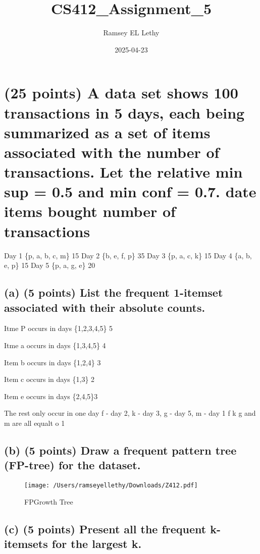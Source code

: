 \documentclass[
]{article}
\title{CS412\_Assignment\_5}
\author{Ramsey EL Lethy}
\date{2025-04-23}
\begin{document}
\maketitle

\section{(25 points) A data set shows 100 transactions in 5 days, each
being summarized as a set of items associated with the number of
transactions. Let the relative min sup = 0.5 and min conf = 0.7. date
items bought number of
transactions}\label{points-a-data-set-shows-100-transactions-in-5-days-each-being-summarized-as-a-set-of-items-associated-with-the-number-of-transactions.-let-the-relative-min-sup-0.5-and-min-conf-0.7.-date-items-bought-number-of-transactions}

Day 1 \{p, a, b, c, m\} 15 Day 2 \{b, e, f, p\} 35 Day 3 \{p, a, c, k\}
15 Day 4 \{a, b, e, p\} 15 Day 5 \{p, a, g, e\} 20

\subsection{(a) (5 points) List the frequent 1-itemset associated with
their absolute
counts.}\label{a-5-points-list-the-frequent-1-itemset-associated-with-their-absolute-counts.}

Itme P occurs in days \{1,2,3,4,5\} 5

Itme a occurs in days \{1,3,4,5\} 4

Item b occurs in days \{1,2,4\} 3

Item c occurs in days \{1,3\} 2

Item e occurs in days \{2,4,5\}3

The rest only occur in one day f - day 2, k - day 3, g - day 5, m - day
1 f k g and m are all equalt o 1

\subsection{(b) (5 points) Draw a frequent pattern tree (FP-tree) for
the
dataset.}\label{b-5-points-draw-a-frequent-pattern-tree-fp-tree-for-the-dataset.}

\begin{figure}
\centering
\texttt{[image: /Users/ramseyellethy/Downloads/Z412.pdf]}
\caption{FPGrowth Tree}
\end{figure}

\subsection{(c) (5 points) Present all the frequent k-itemsets for the
largest
k.}\label{c-5-points-present-all-the-frequent-k-itemsets-for-the-largest-k.}
\end{document}

